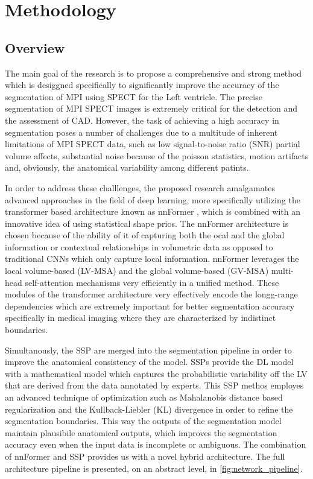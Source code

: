 \chapter{Methodology}
\label{ch:method}

\section{Overview}
The main goal of the research is to propose a comprehensive and strong method which is desiggned specifically to significantly improve the accuracy of the segmentation of MPI using SPECT for the Left ventricle. The precise segmentation of MPI SPECT images is extremely critical for the detection and the assessment of CAD. However, the task of achieving a high accuracy in segmentation poses a number of challenges due to a multitude of inherent limitations of MPI SPECT data, such as low signal-to-noise ratio (SNR) partial volume affects, substantial noise because of the poisson statistics, motion artifacts and, obviously, the anatomical variability among different patints. 

In order to address these challlenges, the proposed research amalgamates advanced approaches in the field of deep learning, more specifically utilizing the transformer based architecture known as nnFormer \cite{10.1109/TIP.2023.3293771}, which is combined with an innovative idea of using statistical shape prios. The nnFormer architecture is chosen because of the ability of it of capturing both the ocal and the global information or contextual relationships in volumetric data as opposed to traditional CNNs which only capture local information. nnFormer leverages the local volume-based (LV-MSA) and the global volume-based (GV-MSA) multi-head self-attention mechanisms very efficiently in a unified method. These modules of the transformer architecture very effectively encode the longg-range dependencies which are extremely important for better segmentation accuracy specifically in medical imaging where they are characterized by indistinct boundaries.

Simultanously, the SSP are merged into the segmentation pipeline in order to improve the anatomical consistency of the model. SSPs provide the DL model with a mathematical model which captures the probabilistic variability off the LV that are derived from the data annotated by experts. This SSP methos employes an advanced technique of optimization such as Mahalanobis distance based regularization and the Kullback-Liebler (KL) divergence in order to refine the segmentation boundaries. This way the outputs of the segmentation model maintain plausibile anatomical outputs, which improves the segmentation accuracy even when the input data is incomplete or ambiguous. The combination of nnFormer and SSP provides us with a novel hybrid architecture. The full architecture pipeline is presented, on an abstract level, in \cref{fig:network_pipeline}.

